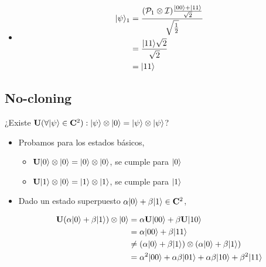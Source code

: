 \documentclass[osajnl,preprint,showpacs,superscriptaddress,10pt]{revtex4-1} %
\DeclarePairedDelimiter\ket{\lvert}{\rangle}
\begin{document}
\begin{itemize}
\begin{itemize}
        \item \begin{fleqn}[\parindent]
        \begin{equation}
        \begin{split}
            \ket{\psi}_1
                &= \frac{(\mathcal{P}_1 \tens \mathcal{I}) \frac{\ket{00} + \ket{11}}{\sqrt{2}}}{\sqrt{\frac{1}{2}}} \\
                &= \frac{\ket{11}\sqrt{2}}{\sqrt{2}} \\
                &= \ket{11}
        \end{split}
        \end{equation}
        \end{fleqn}
    \end{itemize}
\end{itemize}

\subsection{No-cloning}

¿Existe $\mathbf{U} (\forall \ket{\psi} \in \mathbf{C}^2): \ket{\psi} \tens \ket{0} = \ket{\psi} \tens \ket{\psi}$? \\

\begin{itemize}
    \item Probamos para los estados básicos,
    
    \begin{itemize}
        \item $\mathbf{U} \ket{0} \tens \ket{0} = \ket{0} \tens \ket{0}$, se cumple para $\ket{0}$
        \item $\mathbf{U} \ket{1} \tens \ket{0} = \ket{1} \tens \ket{1}$, se cumple para $\ket{1}$
    \end{itemize}
    
    \item Dado un estado superpuesto $\alpha \ket{0} + \beta \ket{1} \in \mathbf{C}^2$,
    
    \begin{fleqn}[\parindent]
    \begin{equation}
    \begin{split}
        \mathbf{U} (\alpha \ket{0} + \beta \ket{1}) \tens \ket{0}
            &= \alpha \mathbf{U} \ket{00} + \beta \mathbf{U} \ket{10} \\
            &= \alpha \ket{00} + \beta \ket{11} \\
            & \neq (\alpha \ket{0} + \beta \ket{1}) \tens (\alpha \ket{0} + \beta \ket{1}) \\
            &= \alpha^2 \ket{00} + \alpha \beta \ket{01} + \alpha \beta \ket{10} + \beta^2 \ket{11}
    \end{split}
    \end{equation}
    \end{fleqn}
\end{itemize}
\end{document}
